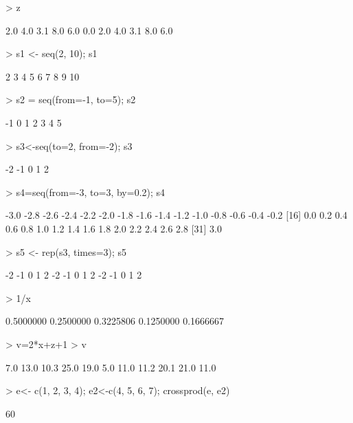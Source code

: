 \documentclass{article}
\begin{document}
\begin{Schunk}
\begin{Sinput}
> z
\end{Sinput}
\begin{Soutput}
 [1] 2.0 4.0 3.1 8.0 6.0 0.0 2.0 4.0 3.1 8.0 6.0
\end{Soutput}
\begin{Sinput}
> s1 <- seq(2, 10); s1 
\end{Sinput}
\begin{Soutput}
[1]  2  3  4  5  6  7  8  9 10
\end{Soutput}
\begin{Sinput}
> s2 = seq(from=-1, to=5); s2
\end{Sinput}
\begin{Soutput}
[1] -1  0  1  2  3  4  5
\end{Soutput}
\begin{Sinput}
> s3<-seq(to=2, from=-2); s3
\end{Sinput}
\begin{Soutput}
[1] -2 -1  0  1  2
\end{Soutput}
\begin{Sinput}
> s4=seq(from=-3, to=3, by=0.2); s4
\end{Sinput}
\begin{Soutput}
 [1] -3.0 -2.8 -2.6 -2.4 -2.2 -2.0 -1.8 -1.6 -1.4 -1.2 -1.0 -0.8 -0.6 -0.4 -0.2
[16]  0.0  0.2  0.4  0.6  0.8  1.0  1.2  1.4  1.6  1.8  2.0  2.2  2.4  2.6  2.8
[31]  3.0
\end{Soutput}
\begin{Sinput}
> s5 <- rep(s3, times=3); s5
\end{Sinput}
\begin{Soutput}
 [1] -2 -1  0  1  2 -2 -1  0  1  2 -2 -1  0  1  2
\end{Soutput}
\begin{Sinput}
> 1/x
\end{Sinput}
\begin{Soutput}
[1] 0.5000000 0.2500000 0.3225806 0.1250000 0.1666667
\end{Soutput}
\begin{Sinput}
> v=2*x+z+1
> v
\end{Sinput}
\begin{Soutput}
 [1]  7.0 13.0 10.3 25.0 19.0  5.0 11.0 11.2 20.1 21.0 11.0
\end{Soutput}
\begin{Sinput}
> e<- c(1, 2, 3, 4); e2<-c(4, 5, 6, 7); crossprod(e, e2) 
\end{Sinput}
\begin{Soutput}
     [,1]
[1,]   60
\end{Soutput}

\end{Schunk}
\end{document}
